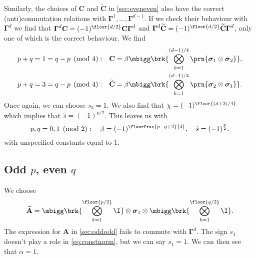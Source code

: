\documentclass[11pt]{article}
\newcommand{\Gammab}{\boldsymbol{\Gamma}}
\newcommand{\A}{\mathbf{A}}
\renewcommand{\C}{\mathbf{C}}
\newcommand{\At}{\widetilde{\mathbf{A}}}
\newcommand{\Ct}{\widetilde{\mathbf{C}}}
\newcommand{\sigmab}{\boldsymbol{\sigma}}
\begin{document}
Similarly, the choices of $\C$ and $\Ct$ in \cref{sec:eveneven} also have the correct (anti)commutation relations with $\Gammab^1, \ldots, \Gammab^{d-1}$.
If we check their behaviour with $\Gammab^d$ we find that $\Gammab^d \C = (-1)^{\floor{d/2}}\C \Gammab^d$ and $\Gammab^d \Ct = (-1)^{\floor{d/2}} \Ct \Gammab^d$, only one of which is the correct behaviour.
We find
%
\begin{equation*}
\begin{aligned}
  p+q &= 1 = q-p \pmod 4: &
  \C &=  \beta \mbigg\brk{\bigotimes_{k=1}^{(d-1)/4} \prn{\sigmab_1 \otimes \sigmab_2}},
  \\
  p+q &= 3 = q-p \pmod 4: &
  \Ct &= \beta \mbigg\brk{\bigotimes_{k=1}^{(d-1)/4} \prn{\sigmab_2 \otimes \sigmab_1}}.
\end{aligned}
\end{equation*}
%
Once again, we can choose $s_3 = 1$.
We also find that $\chi = (-1)^{\floor{(d+2)/4}}$ which implies that $\hat{s} = (-1)^{p/2}$.
This leaves us with
%
\begin{equation}\label{eq:constevenodd}
  p, q = 0,1 \pmod 2 : \quad
  \beta = (-1)^{\floorfrac{p-q+2}{4}}, \quad
  \hat{s} = (-1)^{\frac{p}{2}}.
\end{equation}
%
with unspecified constants equal to 1.



\subsection{Odd \texorpdfstring{$p$}{p}, even \texorpdfstring{$q$}{q}}\label{sec:oddeven}

We choose
%
\begin{equation*}
  \At =
        \mbigg\brk{\bigotimes_{k=1}^{\floor{p/2}} \I}
        \otimes \sigmab_1
        \otimes \mbigg\brk{\bigotimes_{k=1}^{\floor{q/2}} \I}.
\end{equation*}
%
The expression for $\A$ in \cref{sec:oddodd} fails to commute with $\Gammab^d$.
The sign $s_1$ doesn't play a role in \cref{eq:constnorm}, but we can say $s_1 = 1$.
We can then see that $\alpha = 1$.
\end{document}
